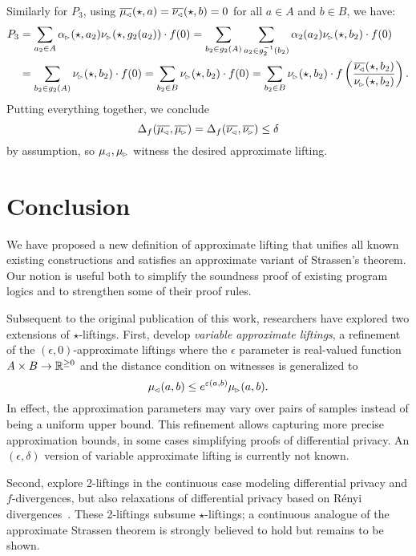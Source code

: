 \documentclass{lmcs}
\begin{document}
  Similarly for $P_3$, using $\overline{\mu_{\mspace{-1.5mu}{\scriptscriptstyle \vartriangleleft}}}(\star, a) =
  \overline{\nu_{\mspace{-1.5mu}{\scriptscriptstyle \vartriangleleft}}}(\star, b) = 0$ for all $a \in A$ and $b \in B$, we have:
  \begin{align*}
    P_3 &= \sum_{a_2 \in A} \alpha_{\mspace{-1.5mu}{\scriptscriptstyle \vartriangleright}}(\star, a_2) \nu_{\mspace{-1.5mu}{\scriptscriptstyle \vartriangleright}}(\star, g_2(a_2)) \cdot f(0)
    = \sum_{b_2 \in g_2(A)} \sum_{a_2 \in g_2^{-1}(b_2)} \alpha_2(a_2)
    \nu_{\mspace{-1.5mu}{\scriptscriptstyle \vartriangleright}}(\star, b_2) \cdot f(0) \\
    &= \sum_{b_2 \in g_2(A)} \nu_{\mspace{-1.5mu}{\scriptscriptstyle \vartriangleright}}(\star, b_2) \cdot f(0)
    = \sum_{b_2 \in B} \nu_{\mspace{-1.5mu}{\scriptscriptstyle \vartriangleright}}(\star, b_2) \cdot f(0)
    = \sum_{b_2 \in B} \nu_{\mspace{-1.5mu}{\scriptscriptstyle \vartriangleright}}(\star, b_2) \cdot
    f \left( \frac{ \overline{\nu_{\mspace{-1.5mu}{\scriptscriptstyle \vartriangleleft}}}(\star, b_2) }{ \nu_{\mspace{-1.5mu}{\scriptscriptstyle \vartriangleright}}(\star, b_2) } \right) .
  \end{align*}
  Putting everything together, we conclude
  \[
    \Delta_f(\overline{\mu_{\mspace{-1.5mu}{\scriptscriptstyle \vartriangleleft}}}, \overline{\mu_{\mspace{-1.5mu}{\scriptscriptstyle \vartriangleright}}}) =
    \Delta_f(\overline{\nu_{\mspace{-1.5mu}{\scriptscriptstyle \vartriangleleft}}}, \overline{\nu_{\mspace{-1.5mu}{\scriptscriptstyle \vartriangleright}}}) \leq \delta
  \]
  by assumption, so $\mu_{\mspace{-1.5mu}{\scriptscriptstyle \vartriangleleft}}, \mu_{\mspace{-1.5mu}{\scriptscriptstyle \vartriangleright}}$ witness the desired approximate
  lifting.
\endproofatend
  
\section{Conclusion}
We have proposed a new definition of approximate lifting that unifies all known
existing constructions and satisfies an approximate variant of Strassen's
theorem. Our notion is useful both to simplify the soundness proof of existing
program logics and to strengthen some of their proof rules.

Subsequent to the original publication of this work, researchers have explored
two extensions of $\star$-liftings. First, \citet{AH17} develop \emph{variable
approximate liftings}, a refinement of the $(\epsilon, 0)$-approximate liftings
where the $\epsilon$ parameter is real-valued function $A \times B \to \mathbb{R}^{\geq 0}$
and the distance condition on witnesses is generalized to
\[
  \mu_{\mspace{-1.5mu}{\scriptscriptstyle \vartriangleleft}}(a, b) \leq e^{\varepsilon(a, b)} \mu_{\mspace{-1.5mu}{\scriptscriptstyle \vartriangleright}}(a, b) .
\]
In effect, the approximation parameters may vary over pairs of samples instead
of being a uniform upper bound. This refinement allows capturing more precise
approximation bounds, in some cases simplifying proofs of differential privacy.
An $(\epsilon, \delta)$ version of variable approximate lifting is currently not
known.

Second, \citet{SBGHK17} explore 2-liftings in the continuous case modeling
differential privacy and $f$-divergences, but also relaxations of differential
privacy based on R\'enyi divergences~\citep{BunS2016,MironovRDP}. These
2-liftings subsume $\star$-liftings; a continuous analogue of the approximate
Strassen theorem is strongly believed to hold but remains to be shown.
\end{document}
